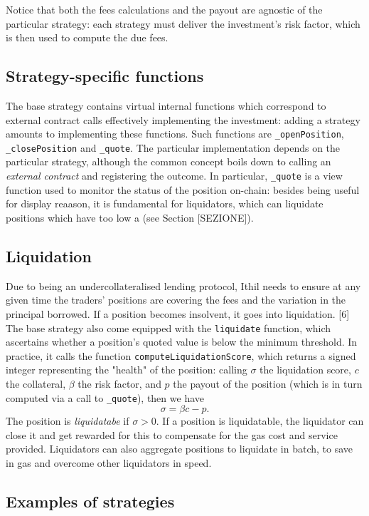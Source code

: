 \documentclass[a4paper,10 pt]{article}
\theoremstyle{definition}
\begin{document}
Notice that both the fees calculations and the payout are agnostic of the particular strategy: each strategy must deliver the investment's risk factor, which is then used to compute the due fees.

\subsection{Strategy-specific functions}

The base strategy contains virtual internal functions which correspond to external contract calls effectively implementing the investment: adding a strategy amounts to implementing these functions. Such functions are \verb|_openPosition|, \verb|_closePosition| and \verb|_quote|. The particular implementation depends on the particular strategy, although the common concept boils down to calling an {\it external contract} and registering the outcome. In particular, \verb|_quote| is a view function used to monitor the status of the position on-chain: besides being useful for display reaason, it is fundamental for liquidators, which can liquidate positions which have too low a  (see Section [SEZIONE]).

\subsection{Liquidation}
Due to being an undercollateralised lending protocol, Ithil needs to ensure at any given time the traders' positions are covering the fees and the variation in the principal borrowed. If a position becomes insolvent, it goes into liquidation. [6]
The base strategy also come equipped with the \verb|liquidate| function, which ascertains whether a position's quoted value is below the minimum threshold. In practice, it calls the function \verb|computeLiquidationScore|, which returns a signed integer representing the "health" of the position: calling $\sigma$ the liquidation score, $c$ the collateral, $\beta$ the risk factor, and $p$ the payout of the position (which is in turn computed via a call to \verb|_quote|), then we have
$$\sigma = \beta c - p.$$
The position is {\it liquidatabe} if $\sigma > 0$. If a position is liquidatable, the liquidator can close it and get rewarded for this to compensate for the gas cost and service provided. Liquidators can also aggregate positions to liquidate in batch, to save in gas and overcome other liquidators in speed.

\subsection{Examples of strategies}
\end{document}
